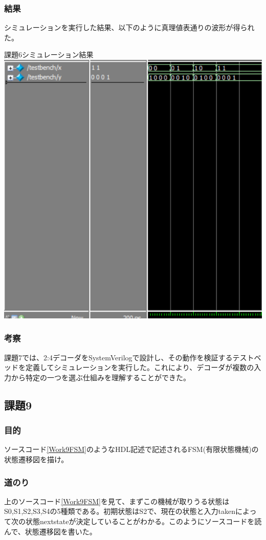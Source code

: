 \documentclass[a4paper]{jarticle}
\begin{document}
\subsubsection{結果}
シミュレーションを実行した結果、以下のように真理値表通りの波形が得られた。
\begin{center}
	課題6シミュレーション結果
	\includegraphics[width=15cm]{7-m.PNG}
\end{center}
\subsubsection{考察}
課題7では、2:4デコーダをSystemVerilogで設計し、その動作を検証するテストベッドを定義してシミュレーションを実行した。これにより、デコーダが複数の入力から特定の一つを選ぶ仕組みを理解することができた。
\subsection{課題9}
\subsubsection{目的}
ソースコード\ref{Work9FSM}のようなHDL記述で記述されるFSM(有限状態機械)の状態遷移図を描け。

\subsubsection{道のり}
上のソースコード\ref{Work9FSM}を見て、まずこの機械が取りうる状態はS0,S1,S2,S3,S4の5種類である。初期状態はS2で、現在の状態と入力takenによって次の状態nextstateが決定していることがわかる。このようにソースコードを読んで、状態遷移図を書いた。
\end{document}
